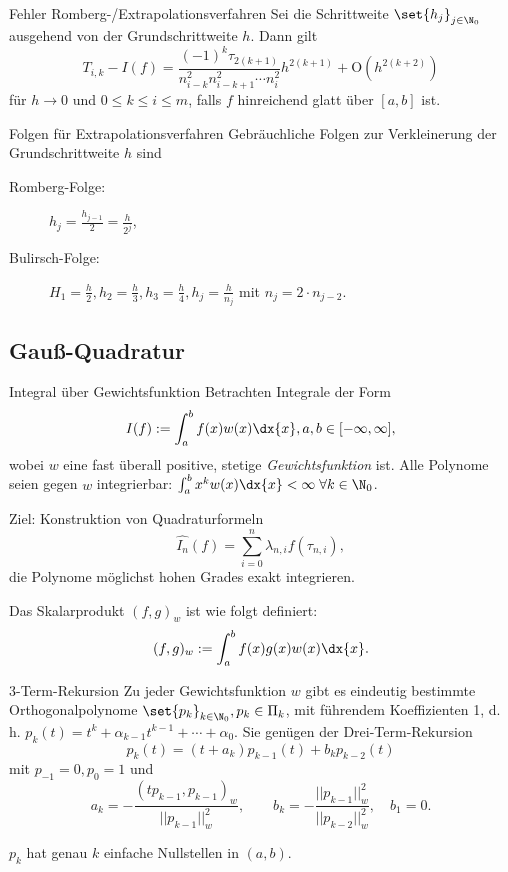 \begin{karte}{Fehler Romberg-/Extrapolationsverfahren}
    Sei die Schrittweite \( \set{h_j}_{j\in\N_0} \) ausgehend von der Grundschrittweite \(h\).
    Dann gilt 
    \[ T_{i,k} - I(f) = \frac{ (-1)^k \tau_{2(k+1)} }{ n_{i-k}^2 n_{i-k+1}^2 \cdots n_i^2 } h^{2(k+1)} + \mathrm{O}(h^{2(k+2)}) \]
    für \( h\rightarrow 0 \) und \( 0 \leq k \leq i \leq m \), falls \(f\) hinreichend glatt über \([a,b]\) ist.
\end{karte}

\begin{karte}{Folgen für Extrapolationsverfahren}
    Gebräuchliche Folgen zur Verkleinerung der Grundschrittweite \(h\) sind 
    \begin{description}
        \item[Romberg-Folge:] \( h_j = \frac{h_{j-1}}{2} = \frac{h}{2^j} \),
        \item[Bulirsch-Folge:] \( H_1 = \frac{h}{2}, h_2 = \frac{h}{3}, h_3 = \frac{h}{4}, h_j = \frac{h}{n_j} \) mit \( n_j = 2 \cdot n_{j-2} \).
    \end{description}
\end{karte}

\subsection*{Gauß-Quadratur}

\begin{karte}{Integral über Gewichtsfunktion}
    Betrachten Integrale der Form 
    \[ I(f) := \int_a^b f(x) w(x) \dx{x}, a,b\in [-\infty, \infty], \]
    wobei \( w \) eine fast überall positive, stetige \textit{Gewichtsfunktion} ist.
    Alle Polynome seien gegen \(w\) integrierbar: \( \int_a^b x^k w(x) \dx{x} < \infty \;\forall k\in \N_0 \).
    
    Ziel: Konstruktion von Quadraturformeln 
    \[ \widehat{I_n}(f) = \sum_{i=0}^n \lambda_{n,i} f(\tau_{n,i}), \]
    die Polynome möglichst hohen Grades exakt integrieren.

    Das Skalarprodukt \((f,g)_w\) ist wie folgt definiert:
    \[ (f,g)_w := \int_a^b f(x) g(x) w(x) \dx{x}. \]
\end{karte}

\begin{karte}{3-Term-Rekursion}
    Zu jeder Gewichtsfunktion \(w\) gibt es eindeutig bestimmte 
    Orthogonalpolynome \( \set{p_k}_{k\in\N_0}, p_k \in \Pi_k \), 
    mit führendem Koeffizienten 1, d. h. \( p_k(t) = t^k + \alpha_{k-1}t^{k-1} + \cdots + \alpha_0 \).
    Sie genügen der Drei-Term-Rekursion 
    \[ p_k(t) = (t + a_k) p_{k-1}(t) + b_k p_{k-2}(t) \]
    mit \( p_{-1} = 0, p_0 = 1 \)  und 
    \[ a_k = -\frac{ (tp_{k-1}, p_{k-1})_w }{ ||p_{k-1}||_w^2 }, \qquad 
    b_k = - \frac{ ||p_{k-1}||_w^2 }{ || p_{k-2} ||_w^2 }, \quad b_1 = 0. \]

    \( p_k \) hat genau \(k\) einfache Nullstellen in \( (a,b) \).
\end{karte}

